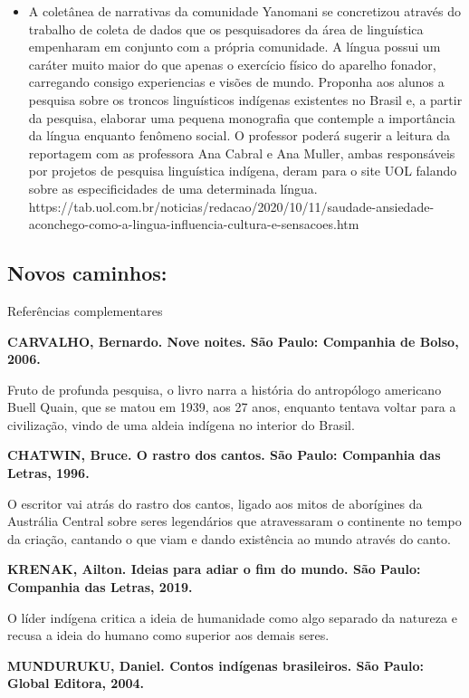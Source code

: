 \documentclass[12pt]{extarticle}
\begin{document}
\begin{itemize}
\item
  A coletânea de narrativas da comunidade Yanomani se concretizou
  através do trabalho de coleta de dados que os pesquisadores da área de
  linguística empenharam em conjunto com a própria comunidade. A língua
  possui um caráter muito maior do que apenas o exercício físico do
  aparelho fonador, carregando consigo experiencias e visões de mundo.
  Proponha aos alunos a pesquisa sobre os troncos linguísticos indígenas
  existentes no Brasil e, a partir da pesquisa, elaborar uma pequena
  monografia que contemple a importância da língua enquanto fenômeno
  social. O professor poderá sugerir a leitura da reportagem com as
  professora Ana Cabral e Ana Muller, ambas responsáveis por projetos de
  pesquisa linguística indígena, deram para o site UOL falando sobre as
  especificidades de uma determinada língua.
  https://tab.uol.com.br/noticias/redacao/2020/10/11/saudade-ansiedade-aconchego-como-a-lingua-influencia-cultura-e-sensacoes.htm\textbf{\\
  }
\end{itemize}

\subsection{Novos caminhos:} Referências complementares

\textbf{CARVALHO, Bernardo. Nove noites. São Paulo: Companhia de Bolso,
2006.}

Fruto de profunda pesquisa, o livro narra a história do antropólogo
americano Buell Quain, que se matou em 1939, aos 27 anos, enquanto
tentava voltar para a civilização, vindo de uma aldeia indígena no
interior do Brasil.

\textbf{CHATWIN, Bruce. O rastro dos cantos. São Paulo: Companhia das
Letras, 1996.}

O escritor vai atrás do rastro dos cantos, ligado aos mitos de
aborígines da Austrália Central sobre seres legendários que atravessaram
o continente no tempo da criação, cantando o que viam e dando existência
ao mundo através do canto.

\textbf{KRENAK, Ailton. Ideias para adiar o fim do mundo. São Paulo:
Companhia das Letras, 2019.}

O líder indígena critica a ideia de humanidade como algo separado da
natureza e recusa a ideia do humano como superior aos demais seres.

\textbf{MUNDURUKU, Daniel. Contos indígenas brasileiros. São Paulo:
Global Editora, 2004.}
\end{document}
